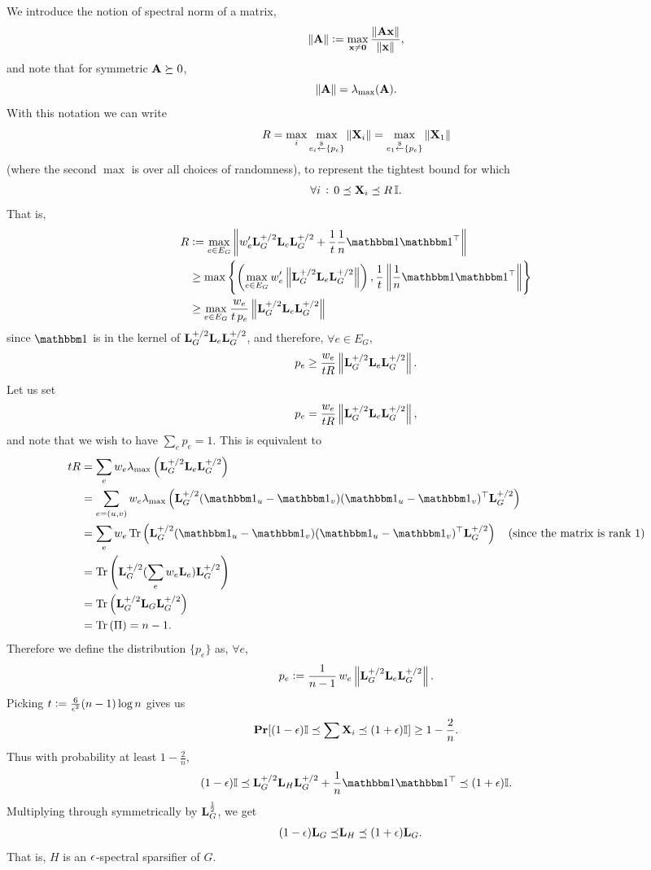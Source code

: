 \documentclass[11pt]{article}
\begin{document}
We introduce the notion of spectral norm of a matrix,
\[\norm{\V{A}} := \max_{\V{x} \ne \mathbf{0}}
\frac{\norm{\V{A}\V{x}}}{\norm{\V{x}}},\] and note that
for symmetric $\V{A} \GE 0$, \[\norm{\V{A}} = \lM(\V{A}).\]
With this notation we can write
\[R = \max_i \max_{e_i \overset{\$}{\gets} \{p_e\}} \norm{\V{X}_i}
= \max_{e_1 \overset{\$}{\gets} \{p_e\}} \norm{\V{X}_1}\]
(where the second $\max$ is over all choices of randomness),
to represent the tightest bound for which \[ \forall i
\,:\, 0 \LE \V{X}_i \LE R\,\bb{I}.\] That is,
\begin{align*}
R &:= \max_{e\in E_G} \norm{w_e' \V{L}_G^\phalf \V{L}_e \V{L}_G^\phalf
    + \frac{1}{t}\frac{1}{n}\ones\ones^\T } \\
&\ge \max \left\{ \left( \max_{e\in E_G} w_e'
    \norm{\V{L}_G^\phalf \V{L}_e \V{L}_G^\phalf} \right),
    \frac{1}{t} \norm{\frac{1}{n}\ones\ones^\T} \right\} \\
&\ge \max_{e\in E_G} \frac{w_e}{t\,p_e}
    \norm{\V{L}_G^\phalf \V{L}_e \V{L}_G^\phalf}
\end{align*}
since $\ones$ is in the kernel of $\V{L}_G^\phalf \V{L}_e \V{L}_G^\phalf$,
and therefore, $\forall e \in E_G$,
\[ p_e \ge \frac{w_e}{tR} \norm{\V{L}_G^\phalf \V{L}_e \V{L}_G^\phalf}. \]
Let us set
\[ p_e = \frac{w_e}{tR} \norm{\V{L}_G^\phalf \V{L}_e \V{L}_G^\phalf}, \]
and note that we wish to have $\sum_e p_e = 1$. This is equivalent to
\begin{align*}
tR &= \sum_e w_e \lM\paren{\V{L}_G^\phalf \V{L}_e \V{L}_G^\phalf} \\
&= \sum_{e=(u,v)} w_e \lM\paren{\V{L}_G^\phalf
    (\ones_u - \ones_v)(\ones_u - \ones_v)^\T \V{L}_G^\phalf} \\
&= \sum_e w_e \tr{\V{L}_G^\phalf
    (\ones_u - \ones_v)(\ones_u - \ones_v)^\T \V{L}_G^\phalf}
    \text{ ~ (since the matrix is rank 1)} \\
&= \tr{\V{L}_G^\phalf (\sum_e w_e \V{L}_e) \V{L}_G^\phalf} \\
&= \tr{\V{L}_G^\phalf \V{L}_G \V{L}_G^\phalf} \\
&= \tr{\Pi} = n - 1.
\end{align*}
Therefore we define the distribution $\{p_e\}$ as, $\forall e$,
\[ p_e := \frac{1}{n-1} \, w_e \norm{\V{L}_G^\phalf \V{L}_e \V{L}_G^\phalf}. \]
Picking $t := \frac{6}{\epsilon^2}(n-1)\log n$ gives us
\[ \pr[(1-\eps)\bb{I} \LE \sum \V{X}_i \LE (1+\eps) \bb{I}] \ge 1 - \frac{2}{n}. \]
Thus with probability at least $1 - \frac{2}{n}$,
\[ (1-\eps) \bb{I} \LE \V{L}_G^\phalf \V{L}_H \V{L}_G^\phalf
    + \frac{1}{n} \ones\ones^\T \LE (1+\eps) \bb{I}. \]
Multiplying through symmetrically by $\V{L}_G^\half$, we get
\begin{align*}
(1-\eps) \V{L}_G \LE &\V{L}_H \LE (1+\eps) \V{L}_G.
\end{align*}
That is, $H$ is an $\epsilon$-spectral sparsifier of $G$.
\end{document}
